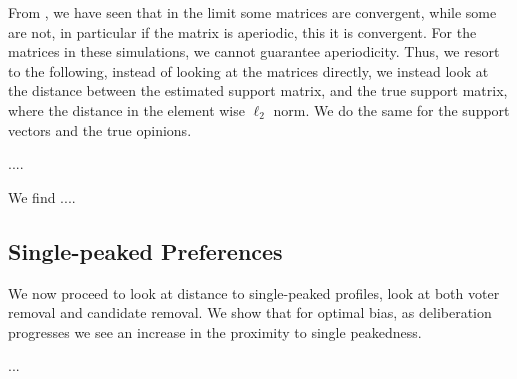 From , we have seen that in the limit some matrices are
convergent, while some are not, in particular if the matrix is aperiodic, this
it is convergent. For the matrices in these simulations, we cannot guarantee 
aperiodicity. Thus, we resort to the following, instead of looking at the
matrices directly, we instead look at the distance between the estimated
support matrix, and the true support matrix, where the distance in the element
wise $\ell_2$ norm. We do the same for the support vectors and the true
opinions.

....


We find ....


\subsection{Single-peaked Preferences}

We now proceed to look at distance to single-peaked profiles, look at both
voter removal and candidate removal. We show that for optimal bias, as
deliberation progresses we see an increase in the proximity to single
peakedness.

...
